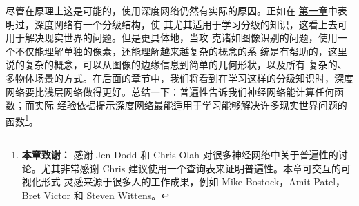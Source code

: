 尽管在原理上这是可能的，使用深度网络仍然有实际的原因。正如在%
\hyperref[sec:toward_deep_learning]{第一章}中表明过，深度网络有一个分级结构，使
其尤其适用于学习分级的知识，这看上去可用于解决现实世界的问题。但是更具体地，当攻
克诸如图像识别的问题，使用一个不仅能理解单独的像素，还能理解越来越复杂的概念的系
统是有帮助的，这里说的复杂的概念，可以从图像的边缘信息到简单的几何形状，以及所有
复杂的、多物体场景的方式。在后面的章节中，我们将看到在学习这样的分级知识时，深度
网络要比浅层网络做得更好。总结一下：普遍性告诉我们神经网络能计算任何函数；而实际
经验依据提示深度网络最能适用于学习能够解决许多现实世界问题的函数\footnote{
  \textbf{本章致谢：} 感谢 Jen Dodd 和 Chris Olah 对很多神经网络中关于普遍性的讨
  论。尤其非常感谢 Chris 建议使用一个查询表来证明普遍性。本章可交互的可视化形式
  灵感来源于很多人的工作成果，例如 Mike Bostock，Amit Patel，Bret Victor 和
  Steven Wittens。}。
